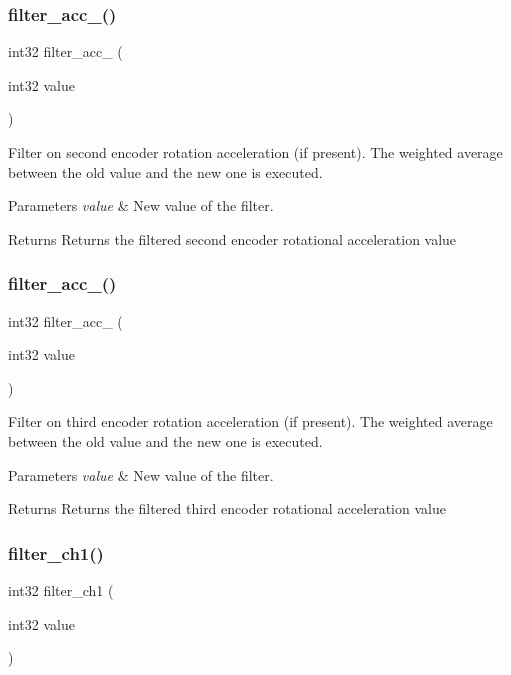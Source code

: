 \subsubsection{filter\+\_\+acc\+\_()}
{\footnotesize\ttfamily int32 filter\+\_\+acc\+\_ (\begin{DoxyParamCaption}\item[{int32}]{value }\end{DoxyParamCaption})}

Filter on second encoder rotation acceleration (if present). The weighted average between the old value and the new one is executed.


\begin{DoxyParams}{Parameters}
{\em value} & New value of the filter.\\
\hline
\end{DoxyParams}
\begin{DoxyReturn}{Returns}
Returns the filtered second encoder rotational acceleration value 
\end{DoxyReturn}
\mbox{\label{utils_8h_a5124047254c64be63f96ae68d2e28149}} 
\subsubsection{filter\+\_\+acc\+\_()}
{\footnotesize\ttfamily int32 filter\+\_\+acc\+\_ (\begin{DoxyParamCaption}\item[{int32}]{value }\end{DoxyParamCaption})}

Filter on third encoder rotation acceleration (if present). The weighted average between the old value and the new one is executed.


\begin{DoxyParams}{Parameters}
{\em value} & New value of the filter.\\
\hline
\end{DoxyParams}
\begin{DoxyReturn}{Returns}
Returns the filtered third encoder rotational acceleration value 
\end{DoxyReturn}
\mbox{\label{utils_8h_ae143e439a41178d1cf10da4920488f86}} 
\subsubsection{filter\+\_\+ch1()}
{\footnotesize\ttfamily int32 filter\+\_\+ch1 (\begin{DoxyParamCaption}\item[{int32}]{value }\end{DoxyParamCaption})}

